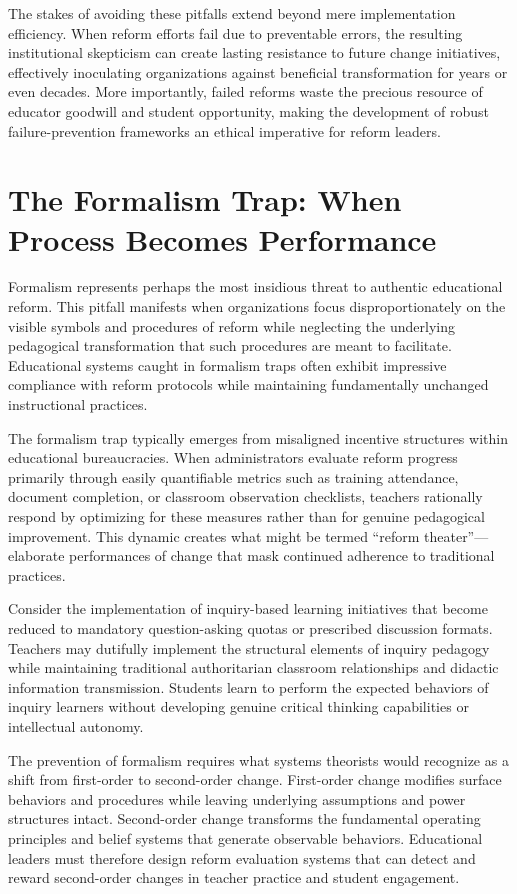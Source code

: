 \documentclass[
  Letterpaper,
]{scrbook}
\begin{document}
The stakes of avoiding these pitfalls extend beyond mere implementation
efficiency. When reform efforts fail due to preventable errors, the
resulting institutional skepticism can create lasting resistance to
future change initiatives, effectively inoculating organizations against
beneficial transformation for years or even decades. More importantly,
failed reforms waste the precious resource of educator goodwill and
student opportunity, making the development of robust failure-prevention
frameworks an ethical imperative for reform leaders.

\section{The Formalism Trap: When Process Becomes
Performance}\label{the-formalism-trap-when-process-becomes-performance}

Formalism represents perhaps the most insidious threat to authentic
educational reform. This pitfall manifests when organizations focus
disproportionately on the visible symbols and procedures of reform while
neglecting the underlying pedagogical transformation that such
procedures are meant to facilitate. Educational systems caught in
formalism traps often exhibit impressive compliance with reform
protocols while maintaining fundamentally unchanged instructional
practices.

The formalism trap typically emerges from misaligned incentive
structures within educational bureaucracies. When administrators
evaluate reform progress primarily through easily quantifiable metrics
such as training attendance, document completion, or classroom
observation checklists, teachers rationally respond by optimizing for
these measures rather than for genuine pedagogical improvement. This
dynamic creates what might be termed ``reform theater''---elaborate
performances of change that mask continued adherence to traditional
practices.

Consider the implementation of inquiry-based learning initiatives that
become reduced to mandatory question-asking quotas or prescribed
discussion formats. Teachers may dutifully implement the structural
elements of inquiry pedagogy while maintaining traditional authoritarian
classroom relationships and didactic information transmission. Students
learn to perform the expected behaviors of inquiry learners without
developing genuine critical thinking capabilities or intellectual
autonomy.

The prevention of formalism requires what systems theorists would
recognize as a shift from first-order to second-order change.
First-order change modifies surface behaviors and procedures while
leaving underlying assumptions and power structures intact. Second-order
change transforms the fundamental operating principles and belief
systems that generate observable behaviors. Educational leaders must
therefore design reform evaluation systems that can detect and reward
second-order changes in teacher practice and student engagement.
\end{document}
